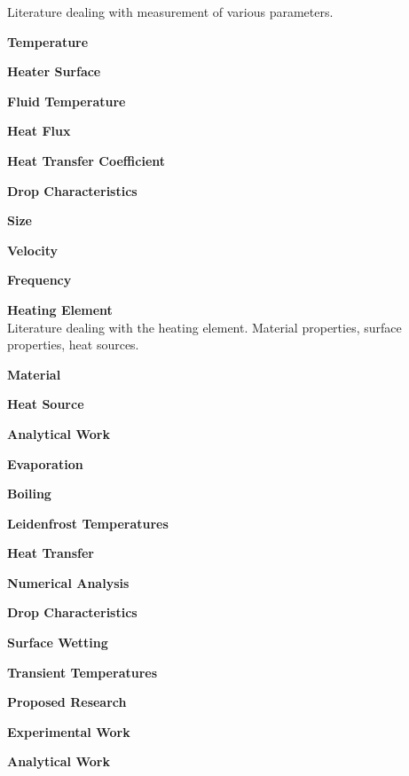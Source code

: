 \documentclass{report}
\begin{document}
\begin{outline}
\begin{outline}
\begin{outline}
	Literature dealing with measurement of various parameters.
      \begin{outline}
	\item {\bf Temperature }
        \begin{outline}
          \item {\bf Heater Surface }
	  \item {\bf Fluid Temperature }
	  \item {\bf Heat Flux }
	  \item {\bf Heat Transfer Coefficient }
        \end{outline}
	\item {\bf Drop Characteristics }
	\begin{outline}
	  \item {\bf Size }
	  \item {\bf Velocity }
	  \item {\bf Frequency }
        \end{outline}
      \end{outline}
      \item {\bf Heating Element } \\
	Literature dealing with the heating element.  Material
	properties, surface properties, heat sources.
      \begin{outline}
	\item {\bf Material }
	\item {\bf Heat Source }
      \end{outline}
    \end{outline}
    \item {\bf Analytical Work }
    \begin{outline}
      \item {\bf Evaporation }
      \item {\bf Boiling }
      \item {\bf Leidenfrost Temperatures }
      \item {\bf Heat Transfer }
      \item {\bf Numerical Analysis }
      \begin{outline}
	\item {\bf Drop Characteristics }
	\item {\bf Surface Wetting }
	\item {\bf Transient Temperatures }
      \end{outline}
    \end{outline}
  \end{outline}
  \item {\bf Proposed Research }
  \begin{outline}
    \item {\bf Experimental Work }
    \item {\bf Analytical Work }
  \end{outline}
\end{outline}
\end{document}
